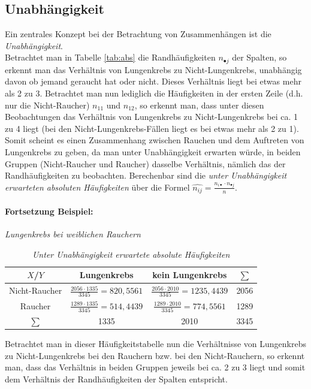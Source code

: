 \documentclass[a4paper]{article}
\begin{document}
\subsection{Unabhängigkeit}
Ein zentrales Konzept bei der Betrachtung von Zusammenhängen ist die \textit{Unabhängigkeit}.\\
Betrachtet man in Tabelle \ref{tab:abs} die Randhäufigkeiten $n_{\bullet j}$ der Spalten, so erkennt man das Verhältnis von Lungenkrebs zu Nicht-Lungenkrebs, unabhängig davon ob jemand geraucht hat oder nicht. Dieses Verhältnis liegt bei etwas mehr als 2 zu 3. Betrachtet man nun lediglich die Häufigkeiten in der ersten Zeile (d.h. nur die Nicht-Raucher) $n_{11}$ und $n_{12}$, so erkennt man, dass unter diesen Beobachtungen das Verhältnis von Lungenkrebs zu Nicht-Lungenkrebs bei ca. 1 zu 4 liegt (bei den Nicht-Lungenkrebs-Fällen liegt es bei etwas mehr als 2 zu 1). Somit scheint es einen Zusammenhang zwischen Rauchen und dem Auftreten von Lungenkrebs zu geben, da man unter Unabhängigkeit erwarten würde, in beiden Gruppen (Nicht-Raucher und Raucher) dasselbe Verhältnis, nämlich das der Randhäufigkeiten zu beobachten. Berechenbar sind die \textit{unter Unabhängigkeit erwarteten absoluten Häufigkeiten} über die Formel $\hat{n_{ij}} = \frac{n_{i\bullet} \cdot n_{\bullet j}}{n}$.

\noindent \paragraph{Fortsetzung Beispiel:} \textit{Lungenkrebs bei weiblichen Rauchern}
\begin{table}[htbp]
\begin{tabular}{c|cc|c}
    $X$/$Y$         & Lungenkrebs & kein Lungenkrebs & $\sum$ \\
     \hline
    Nicht-Raucher   & $\frac{2056\cdot1335}{3345} = 820,5561$         & $\frac{2056\cdot2010}{3345} = 1235,4439$             & 2056 \\
    Raucher         & $\frac{1289\cdot1335}{3345} = 514,4439$         & $\frac{1289\cdot2010}{3345} = 774,5561$             & 1289 \\
    \hline
    $\sum$          & 1335        & 2010             & 3345
\end{tabular}
    \caption{\textit{Unter Unabhängigkeit erwartete absolute Häufigkeiten}}
    \label{tab:abs-unabh}
\end{table}

\noindent Betrachtet man in dieser Häufigkeitstabelle nun die Verhältnisse von Lungenkrebs zu Nicht-Lungen\-krebs bei den Rauchern bzw. bei den Nicht-Rauchern, so erkennt man, dass das Verhältnis in beiden Gruppen jeweils bei ca. 2 zu 3 liegt und somit dem Verhältnis der Randhäufigkeiten der Spalten entspricht.
\end{document}
